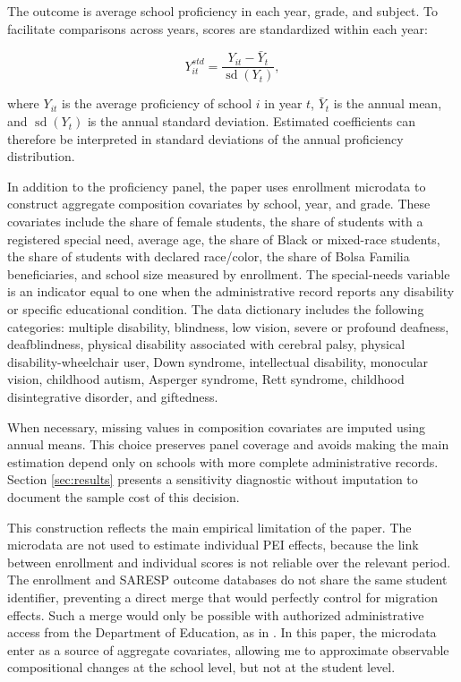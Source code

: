 The outcome is average school proficiency in each year, grade, and subject. To facilitate comparisons across years, scores are standardized within each year:

\begin{equation}
Y_{it}^{std} = \frac{Y_{it} - \bar{Y}_{t}}{\operatorname{sd}(Y_t)},
\end{equation}

where $Y_{it}$ is the average proficiency of school $i$ in year $t$, $\bar{Y}_{t}$ is the annual mean, and $\operatorname{sd}(Y_t)$ is the annual standard deviation. Estimated coefficients can therefore be interpreted in standard deviations of the annual proficiency distribution.

In addition to the proficiency panel, the paper uses enrollment microdata to construct aggregate composition covariates by school, year, and grade. These covariates include the share of female students, the share of students with a registered special need, average age, the share of Black or mixed-race students, the share of students with declared race/color, the share of Bolsa Familia beneficiaries, and school size measured by enrollment. The special-needs variable is an indicator equal to one when the administrative record reports any disability or specific educational condition. The data dictionary includes the following categories: multiple disability, blindness, low vision, severe or profound deafness, deafblindness, physical disability associated with cerebral palsy, physical disability-wheelchair user, Down syndrome, intellectual disability, monocular vision, childhood autism, Asperger syndrome, Rett syndrome, childhood disintegrative disorder, and giftedness.

When necessary, missing values in composition covariates are imputed using annual means. This choice preserves panel coverage and avoids making the main estimation depend only on schools with more complete administrative records. Section \ref{sec:results} presents a sensitivity diagnostic without imputation to document the sample cost of this decision.

This construction reflects the main empirical limitation of the paper. The microdata are not used to estimate individual PEI effects, because the link between enrollment and individual scores is not reliable over the relevant period. The enrollment and SARESP outcome databases do not share the same student identifier, preventing a direct merge that would perfectly control for migration effects. Such a merge would only be possible with authorized administrative access from the Department of Education, as in \textcite{scorzafave2023}. In this paper, the microdata enter as a source of aggregate covariates, allowing me to approximate observable compositional changes at the school level, but not at the student level.

